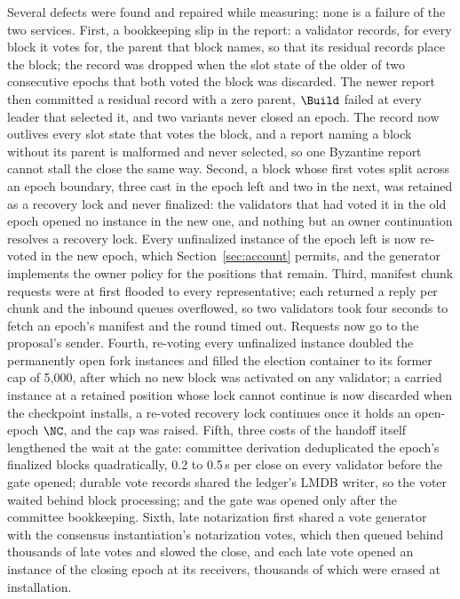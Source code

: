 Several defects were found and repaired while measuring; none is a failure of the two services. First, a bookkeeping slip in the report: a validator records, for every block it votes for, the parent that block names, so that its residual records place the block; the record was dropped when the slot state of the older of two consecutive epochs that both voted the block was discarded. The newer report then committed a residual record with a zero parent, $\Build$ failed at every leader that selected it, and two variants never closed an epoch. The record now outlives every slot state that votes the block, and a report naming a block without its parent is malformed and never selected, so one Byzantine report cannot stall the close the same way. Second, a block whose first votes split across an epoch boundary, three cast in the epoch left and two in the next, was retained as a recovery lock and never finalized: the validators that had voted it in the old epoch opened no instance in the new one, and nothing but an owner continuation resolves a recovery lock. Every unfinalized instance of the epoch left is now re-voted in the new epoch, which Section~\ref{sec:account} permits, and the generator implements the owner policy for the positions that remain. Third, manifest chunk requests were at first flooded to every representative; each returned a reply per chunk and the inbound queues overflowed, so two validators took four seconds to fetch an epoch's manifest and the round timed out. Requests now go to the proposal's sender. Fourth, re-voting every unfinalized instance doubled the permanently open fork instances and filled the election container to its former cap of 5{,}000, after which no new block was activated on any validator; a carried instance at a retained position whose lock cannot continue is now discarded when the checkpoint installs, a re-voted recovery lock continues once it holds an open-epoch $\NC$, and the cap was raised. Fifth, three costs of the handoff itself lengthened the wait at the gate: committee derivation deduplicated the epoch's finalized blocks quadratically, 0.2 to 0.5\,s per close on every validator before the gate opened; durable vote records shared the ledger's LMDB writer, so the voter waited behind block processing; and the gate was opened only after the committee bookkeeping. Sixth, late notarization first shared a vote generator with the consensus instantiation's notarization votes, which then queued behind thousands of late votes and slowed the close, and each late vote opened an instance of the closing epoch at its receivers, thousands of which were erased at installation.

